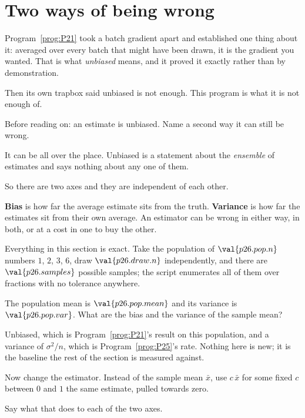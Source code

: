 \section{Two ways of being wrong}
\label{sec:P26-two-ways}

\begin{fr}
Program~\ref{prog:P21} took a batch gradient apart and established one thing
about it: averaged over every batch that might have been drawn, it is the
gradient you wanted. That is what \emph{unbiased} means, and it proved it
exactly rather than by demonstration.

Then its own trapbox said unbiased is not enough. This program is what it is
not enough of.

Before reading on: an estimate is unbiased. Name a second way it can still be
wrong.
\dotline
\nextframe
\end{fr}

\begin{fr}
\begin{ansblock}
It can be all over the place. Unbiased is a statement about the
\emph{ensemble} of estimates and says nothing about any one of them.
\end{ansblock}

So there are two axes and they are independent of each other.

\textbf{Bias} is how far the average estimate sits from the truth.
\textbf{Variance} is how far the estimates sit from their own average. An
estimator can be wrong in either way, in both, or \dash{} at a cost \dash{} in
one to buy the other.

Everything in this section is exact. Take the population of
$\val{p26.pop.n}$ numbers $1$, $2$, $3$, $6$, draw
$\val{p26.draw.n}$ independently, and there are $\val{p26.samples}$ possible
samples; the script enumerates all of them over fractions with no tolerance
anywhere.

The population mean is $\val{p26.pop.mean}$ and its variance is
$\val{p26.pop.var}$. What are the bias and the variance of the sample mean?
\dotline
\nextframe
\end{fr}

\begin{fr}

Unbiased, which is Program~\ref{prog:P21}'s result on this population, and a
variance of $\sigma^{2}/n$, which is Program~\ref{prog:P25}'s rate. Nothing
here is new; it is the baseline the rest of the section is measured against.

Now change the estimator. Instead of the sample mean $\bar{x}$, use
$c\,\bar{x}$ for some fixed $c$ between $0$ and $1$ \dash{} the same estimate,
pulled towards zero.

Say what that does to each of the two axes.
\dotline
\nextframe
\end{fr}

